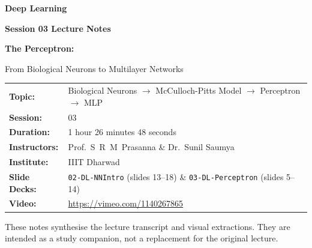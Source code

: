 \documentclass[12pt,a4paper]{article}
\begin{document}
\begin{titlepage}
  \centering
  \vspace*{2cm}

  {\Huge\bfseries Deep Learning\par}
  \vspace{0.4cm}
  {\Large\bfseries Session 03 Lecture Notes\par}
  \vspace{1.2cm}


  \vspace{1.0cm}
  {\LARGE\bfseries The Perceptron:\par}
  \vspace{0.3cm}
  {\large From Biological Neurons to Multilayer Networks\par}
  \vspace{1.5cm}

  \begin{tabular}{ll}
    \textbf{Topic:}       & Biological Neurons $\to$ McCulloch-Pitts Model $\to$
                            Perceptron $\to$ MLP \\[4pt]
    \textbf{Session:}     & 03 \\[4pt]
    \textbf{Duration:}    & 1 hour 26 minutes 48 seconds \\[4pt]
    \textbf{Instructors:} & Prof.\ S~R~M~Prasanna \& Dr.\ Sunil Saumya \\[4pt]
    \textbf{Institute:}   & IIIT Dharwad \\[4pt]
    \textbf{Slide Decks:} & \texttt{02-DL-NNIntro} (slides 13--18)
                            \& \texttt{03-DL-Perceptron} (slides 5--14) \\[4pt]
    \textbf{Video:}       & \url{https://vimeo.com/1140267865} \\
  \end{tabular}

  \vspace{2cm}


  \vfill
  {\small These notes synthesise the lecture transcript and visual extractions.
  They are intended as a study companion, not a replacement for the original lecture.}
\end{titlepage}
\end{document}
